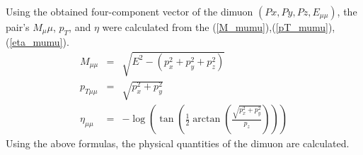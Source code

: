                 Using the obtained four-component vector of the dimuon $(Px, Py, Pz, E_{\mu\mu})$, the pair's $M_\mu\mu$, $p_T$, and $\eta$ were calculated from the (\ref{M_mumu}),(\ref{pT_mumu}),(\ref{eta_mumu}).
                \begin{eqnarray}
                    M_{\mu\mu} &=& \sqrt{E^2 - (p_x^2 + p_y^2 + p_z^2)}\\ \label{M_mumu}
                    p_{T\mu\mu} &=& \sqrt{p_x^2 + p_y^2}\\ \label{pT_mumu}
                    \eta_{\mu\mu} &=& -\log\left(\tan\left(\frac{1}{2}\arctan\left(\frac{\sqrt{p_x^2 + p_y^2}}{p_z}\right)\right)\right) \label{eta_mumu}
                \end{eqnarray}
                Using the above formulas, the physical quantities of the dimuon are calculated.
                
